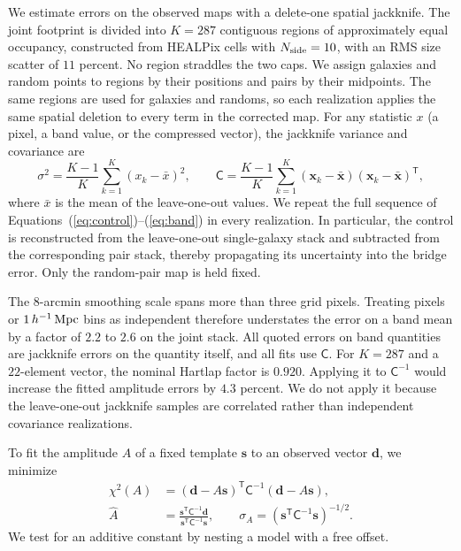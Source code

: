 We estimate errors on the observed maps with a delete-one spatial jackknife.
The joint footprint is divided into $K=287$ contiguous regions of
approximately equal occupancy, constructed from HEALPix cells with
$N_{\rm side}=10$, with an RMS size scatter of $11$ percent.
No region straddles the two caps. We assign galaxies and random points to
regions by their positions and pairs by their midpoints. The same regions are
used for galaxies and randoms, so each realization applies the same spatial
deletion to every term in the corrected map. For any statistic $x$ (a pixel,
a band value, or the compressed vector), the jackknife variance and
covariance are
\begin{equation}
  \sigma^{2}=\frac{K-1}{K}\sum_{k=1}^{K}(x_{k}-\bar x)^{2}, \qquad
  \mathsf{C}=\frac{K-1}{K}\sum_{k=1}^{K}(\mathbf{x}_{k}-\bar{\mathbf{x}})
                                          (\mathbf{x}_{k}-\bar{\mathbf{x}})^{\mathsf T},
  \label{eq:jackknife}
\end{equation}
where $\bar x$ is the mean of the leave-one-out values. We repeat the full
sequence of Equations~(\ref{eq:control})--(\ref{eq:band}) in every
realization. In particular, the control is reconstructed from the
leave-one-out single-galaxy stack and subtracted from the corresponding pair
stack, thereby propagating its uncertainty into the bridge error. Only the
random-pair map is held fixed.

The $8$-arcmin smoothing scale spans more than three grid pixels. Treating
pixels or $1\,h^{-1}\,{\rm Mpc}$ bins as independent therefore
understates the error on a band mean by a factor of $2.2$ to $2.6$ on the
joint stack. %
All quoted errors on band quantities are jackknife errors on the quantity
itself, and all fits use $\mathsf{C}$. For $K=287$ and a $22$-element vector,
the nominal Hartlap factor is $0.920$. Applying it to $\mathsf{C}^{-1}$ would
increase the fitted amplitude errors by $4.3$ percent. We do not apply it
because the leave-one-out jackknife samples are correlated rather than
independent covariance realizations.

To fit the amplitude $A$ of a fixed template $\mathbf{s}$ to an observed
vector $\mathbf{d}$, we minimize
\begin{equation}
  \begin{aligned}
  \chi^{2}(A) &=(\mathbf{d}-A\mathbf{s})^{\mathsf T}\mathsf{C}^{-1}
                 (\mathbf{d}-A\mathbf{s}), \\
  \hat A &=\frac{\mathbf{s}^{\mathsf T}\mathsf{C}^{-1}\mathbf{d}}
                 {\mathbf{s}^{\mathsf T}\mathsf{C}^{-1}\mathbf{s}}, \qquad
  \sigma_{A}=\left(\mathbf{s}^{\mathsf T}\mathsf{C}^{-1}\mathbf{s}\right)^{-1/2}.
  \end{aligned}
  \label{eq:amplitude}
\end{equation}
We test for an additive constant by nesting a model with a free offset.

